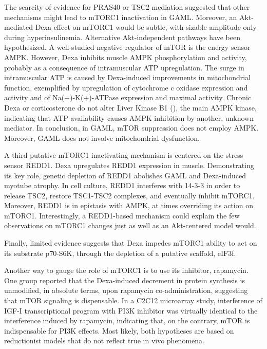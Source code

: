 \documentclass[12pt,english]{report}\usepackage[]{graphicx}\usepackage[]{color}
\begin{document}
The scarcity of evidence for PRAS40 or TSC2 mediation suggested that
other mechanisms might lead to mTORC1 inactivation in GAML. Moreover,
an Akt-mediated Dexa effect on mTORC1 would be subtle, with sizable
amplitude only during hyperinsulinemia. Alternative Akt-independent
pathways have been hypothesized. A well-studied negative regulator
of mTOR is the energy sensor AMPK\citep{koh2008lkb1,canto2010amp-activated}.
However, Dexa inhibits muscle AMPK phosphorylation and activity\citep{williams2012dietary,amaral2010opposite},
probably as a consequence of intramuscular ATP upregulation\citep{dumas2005dexamethasone}.
The surge in intramuscular ATP is caused by Dexa-induced improvements
in mitochondrial function, exemplified by upregulation of cytochrome
c oxidase expression and activity\citep{weber2002glucocorticoid}
and of Na(+)-K(+)-ATPase expression and maximal activity\citep{nordsborg2005dexamethasone}.
Chronic Dexa or corticosterone do not alter Liver Kinase B1 ()\citep{williams2012dietary,nakken2010effects},
the main AMPK kinase, indicating that ATP availability causes AMPK
inhibition by another, unknown mediator. In conclusion, in GAML, mTOR
suppression does not employ AMPK. Moreover, GAML does not involve
mitochondrial dysfunction.

A third putative mTORC1 inactivating mechanism is centered on the
stress sensor REDD1. Dexa upregulates REDD1 expression in muscle\citep{wu2010redd1}.
Demonstrating its key role, genetic depletion of REDD1 abolishes GAML
and Dexa-induced myotube atrophy\citep{wang2006dexamethasone,britto2014redd1}.
In cell culture, REDD1 interferes with 14-3-3 in order to release
TSC2, restore TSC1-TSC2 complexes, and eventually inhibit mTORC1\citep{deyoung2008hypoxia}.
Moreover, REDD1 is in epistasis with AMPK\citep{sofer2005regulation},
at times overriding its action on mTORC1. Interestingly, a REDD1-based
mechanism could explain the few observations on mTORC1 changes just
as well as an Akt-centered model would.

Finally, limited evidence suggests that Dexa impedes mTORC1 ability
to act on its substrate p70-S6K, through the depletion of a putative
scaffold, eIF3f\citep{csibi2010translation}.

Another way to gauge the role of mTORC1 is to use its inhibitor, rapamycin.
One group reported that the Dexa-induced decrement in protein synthesis
is unmodified, in absolute terms, upon rapamycin co-administration\citep{dardevet1999glucocorticoid-induced},
suggesting that mTOR signaling is dispensable. In a C2C12 microarray
study, interference of IGF-I transcriptional program with PI3K inhibitor
was virtually identical to the interference induced by rapamycin\citep{latres2005insulin-like},
indicating that, on the contrary, mTOR is indispensable for PI3K effects.
Most likely, both hypotheses are based on reductionist models that
do not reflect true in vivo phenomena.
\end{document}
